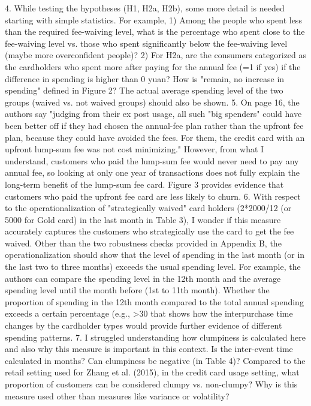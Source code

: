 4. 	While testing the hypotheses (H1, H2a, H2b), some more detail is needed starting with simple statistics. For example,
1) 	Among the people who spent less than the required fee-waiving level, what is the percentage who spent close to the fee-waiving level vs. those who spent significantly below the fee-waiving level (maybe more overconfident people)?
2) 	For H2a, are the consumers categorized as the cardholders who spent more after paying for the annual fee (=1 if yes) if the difference in spending is higher than 0 yuan? How is "remain, no increase in spending" defined in Figure 2? The actual average spending level of the two groups (waived vs. not waived groups) should also be shown.
5. 	On page 16, the authors say "judging from their ex post usage, all such "big spenders" could have been better off if they had chosen the annual-fee plan rather than the upfront fee plan, because they could have avoided the fees. For them, the credit card with an upfront lump-sum fee was not cost minimizing." However, from what I understand, customers who paid the lump-sum fee would never need to pay any annual fee, so looking at only one year of transactions does not fully explain the long-term benefit of the lump-sum fee card. Figure 3 provides evidence that customers who paid the upfront fee card are less likely to churn.
6. 	With respect to the operationalization of "strategically waived" card holders (2*2000/12 (or 5000 for Gold card) in the last month in Table 3), I wonder if this measure accurately captures the customers who strategically use the card to get the fee waived. Other than the two robustness checks provided in Appendix B, the operationalization should show that the level of spending in the last month (or in the last two to three months) exceeds the usual spending level. For example, the authors can compare the spending level in the 12th month and the average spending level until the month before (1st to 11th month). Whether the proportion of spending in the 12th month compared to the total annual spending exceeds a certain percentage (e.g., >30%
that shows how the interpurchase time changes by the cardholder types would provide further evidence of different spending patterns.  
7. 	I struggled understanding how clumpiness is calculated here and also why this measure is important in this context. Is the inter-event time calculated in months? Can clumpiness be negative (in Table 4)? Compared to the retail setting used for Zhang et al. (2015), in the credit card usage setting, what proportion of customers can be considered clumpy vs. non-clumpy? Why is this measure used other than measures like variance or volatility?

